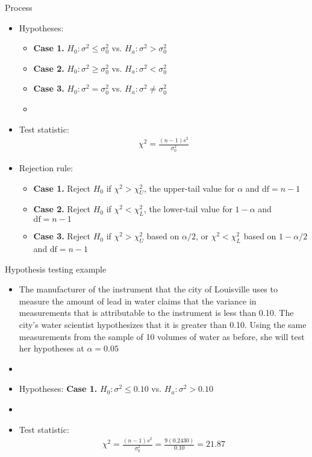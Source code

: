 \documentclass[xcolor=dvipsnames]{beamer}
\begin{document}
\begin{frame}{Process}
	\begin{itemize}
		\item Hypotheses:
		\begin{itemize}
			\item \textbf{Case 1.} $H_0: \sigma^2 \leq \sigma_0^2$ vs. $H_a: \sigma^2 > \sigma_0^2$
			\item \textbf{Case 2.} $H_0: \sigma^2 \geq \sigma_0^2$ vs. $H_a: \sigma^2 < \sigma_0^2$
			\item \textbf{Case 3.} $H_0: \sigma^2 = \sigma_0^2$ vs. $H_a: \sigma^2 \neq \sigma_0^2$
			\item[]
		\end{itemize}
		
		\item Test statistic:
		\begin{gather*}
		\chi^2 = \frac{(n-1)s^2}{\sigma_0^2}
		\end{gather*}
		
		\item Rejection rule:
		\begin{itemize}
			\item \textbf{Case 1.} Reject $H_0$ if $\chi^2 > \chi_U^2$, the upper-tail value for $\alpha$ and $\text{df} = n-1$
			\item \textbf{Case 2.} Reject $H_0$ if $\chi^2 < \chi_L^2$, the lower-tail value for $1-\alpha$ and $\text{df} = n-1$
			\item \textbf{Case 3.} Reject $H_0$ if $\chi^2 > \chi_U^2$ based on $\alpha/2$, or $\chi^2 < \chi_L^2$ based on $1-\alpha/2$ and $\text{df}=n-1$
		\end{itemize}
	\end{itemize}
\end{frame}

\begin{frame}{Hypothesis testing example}
	\begin{itemize}
		\item The manufacturer of the instrument that the city of Louisville uses to measure the amount of lead in water claims that the variance in measurements that is attributable to the instrument is less than 0.10. The city's water scientist hypothesizes that it is greater than 0.10. Using the same measurements from the sample of 10 volumes of water as before, she will test her hypotheses at $\alpha = 0.05$
		\item[]
		\item Hypotheses: \textbf{Case 1.} $H_0: \sigma^2 \leq 0.10$ vs. $H_a: \sigma^2 > 0.10$
		\item[]
		\item Test statistic:
		\begin{gather*}
		\chi^2 = \frac{(n-1)s^2}{\sigma_0^2} = \frac{9 (0.2430)}{0.10} =  21.87
		\end{gather*}
	\end{itemize}
\end{frame}
\end{document}
